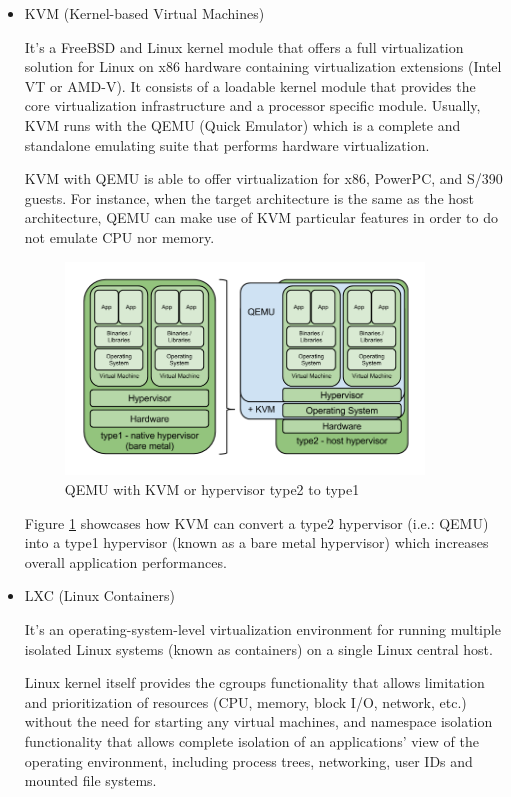 \begin{itemize}
\item KVM (Kernel-based Virtual Machines) \hfill

It's a FreeBSD and Linux kernel module that offers a full virtualization solution for Linux on x86 hardware containing virtualization extensions (Intel VT or AMD-V). It consists of a loadable kernel module that provides the core virtualization infrastructure and a processor specific module.
Usually, KVM runs with the QEMU (Quick Emulator) which is a complete and standalone emulating suite that performs hardware virtualization.

KVM with QEMU is able to offer virtualization for x86, PowerPC, and S/390 guests. For instance, when the target architecture is the same as the host architecture, QEMU can make use of KVM particular features in order to do not emulate CPU nor memory.

\begin{figure}[!htb]
\begin{center}
\includegraphics[width=0.9\textwidth]{./images/KVM.png}
\caption{QEMU with KVM or hypervisor type2 to type1}
\label{F:KVMandQEMU}
\end{center}
\end{figure}

Figure \ref{F:KVMandQEMU} showcases how KVM can convert a type2 hypervisor (i.e.: QEMU) into a type1 hypervisor (known as a bare metal hypervisor) which increases overall application performances. 

\item LXC (Linux Containers) \hfill

It's an operating-system-level virtualization environment for running multiple isolated Linux systems (known as containers) on a single Linux central host.

Linux kernel itself provides the cgroups functionality that allows limitation and prioritization of resources (CPU, memory, block I/O, network, etc.) without the need for starting any virtual machines, and namespace isolation functionality that allows complete isolation of an applications' view of the operating environment, including process trees, networking, user IDs and mounted file systems.


\end{itemize}
